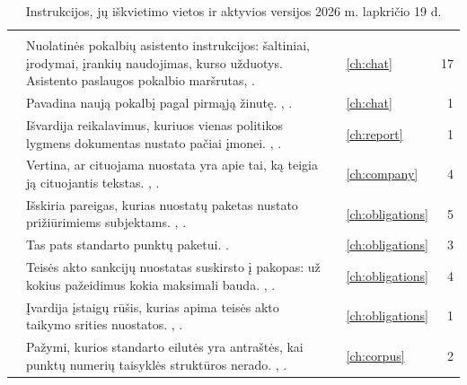 \begin{xltabular}{\textwidth}{@{}L{40mm}YL{21mm}L{17mm}r@{}}
\caption{Instrukcijos, jų iškvietimo vietos ir aktyvios versijos 2026 m. lapkričio 19 d.}\label{tab:prompts:all}\\
\toprule
{} &  &  &  &  \\
\midrule
\endfirsthead
\toprule
{} &  &  &  &  \\
\midrule
\endhead
\bottomrule
\endlastfoot
{} & Nuolatinės pokalbių asistento instrukcijos: šaltiniai, įrodymai, įrankių naudojimas, kurso užduotys. Asistento paslaugos pokalbio maršrutas, . &  & \cref{ch:chat} & 17 \\
 & Pavadina naują pokalbį pagal pirmąją žinutę. , . &  & \cref{ch:chat} & 1 \\
 & Išvardija reikalavimus, kuriuos vienas politikos lygmens dokumentas nustato pačiai įmonei. , . &  & \cref{ch:report} & 1 \\
 & Vertina, ar cituojama nuostata yra apie tai, ką teigia ją cituojantis tekstas. , . &  & \cref{ch:company} & 4 \\
 & Išskiria pareigas, kurias nuostatų paketas nustato prižiūrimiems subjektams. , . &  & \cref{ch:obligations} & 5 \\
 & Tas pats standarto punktų paketui. . &  & \cref{ch:obligations} & 3 \\
 & Teisės akto sankcijų nuostatas suskirsto į pakopas: už kokius pažeidimus kokia maksimali bauda. , . &  & \cref{ch:obligations} & 4 \\
 & Įvardija įstaigų rūšis, kurias apima teisės akto taikymo srities nuostatos. , . &  & \cref{ch:obligations} & 1 \\
 & Pažymi, kurios standarto eilutės yra antraštės, kai punktų numerių taisyklės struktūros nerado. , . &  & \cref{ch:corpus} & 2 \\

\end{xltabular}
